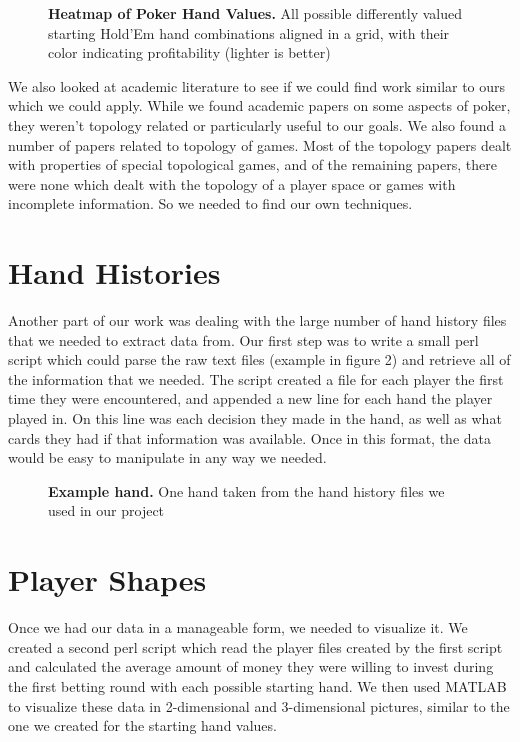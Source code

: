 \documentclass[11pt]{article}
\begin{document}
\begin{figure}[ht!]
  		\caption{\textbf{Heatmap of Poker Hand Values.} All possible differently 
  		valued starting Hold'Em hand combinations aligned in a grid, with 
  		their color indicating profitability (lighter is better)}
\end{figure}

We also
looked at academic literature to see if we could find work similar to ours which
we could apply. While we found academic papers on some aspects of poker, they
weren't topology related or particularly useful to our goals. We also found a
number of papers related to topology of games. Most of the topology papers dealt
with properties of special topological games, and of the remaining papers, there
were none which dealt with the topology of a player space or games with incomplete
information. So we needed to find our own techniques.

\section*{Hand Histories}
Another part of our work was dealing with the large number of hand history files
that we needed to extract data from. Our first step was to write a small perl
script which could parse the raw text files (example in figure 2) and retrieve
all of the information that we needed. The script created a file for each player
the first time they were encountered, and appended a new line for each hand the
player played in. On this line was each decision they made in the hand, as well
as what cards they had if that information was available. Once in this format,
the data would be easy to manipulate in any way we needed.

\begin{figure}[ht!]
  		\caption{\textbf{Example hand.} One hand taken from the hand history files
  		we used in our project}
\end{figure}

\section*{Player Shapes}
Once we had our data in a manageable form, we needed to visualize it. We created
a second perl script which read the player files created by the first script and 
calculated the average amount of money they were willing to invest during the
first betting round with each possible starting hand. We then used MATLAB to
visualize these data in 2-dimensional and 3-dimensional pictures, similar to the
one we created for the starting hand values.
\end{document}
